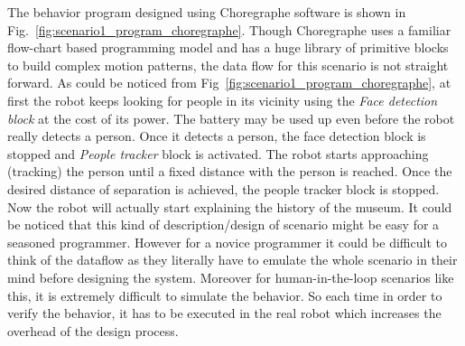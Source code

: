 The behavior program designed using Choregraphe software is shown in Fig.~\ref{fig:scenario1_program_choregraphe}. Though Choregraphe uses a familiar flow-chart based programming model and has a huge library of primitive blocks to build complex motion patterns, the data flow for this scenario is not straight forward. As could be noticed from Fig~\ref{fig:scenario1_program_choregraphe}, at first the robot keeps looking for people in its vicinity using the \emph{Face detection block} at the cost of its power. The battery may be used up even before the robot really detects a person. Once it detects a person, the face detection block is stopped and \emph{People tracker} block is activated. The robot starts approaching (tracking) the person until a fixed distance with the person is reached. Once the desired distance of separation is achieved, the people tracker block is stopped. Now the robot will actually start explaining the history of the museum. It could be noticed that this kind of description/design of scenario might be easy for a seasoned programmer. However for a novice programmer it could be difficult to think of the dataflow as they literally have to emulate the whole scenario in their mind before designing the system. Moreover for human-in-the-loop scenarios like this, it is extremely difficult to simulate the behavior. So each time in order to verify the behavior, it has to be executed in the real robot which increases the overhead of the design process.

